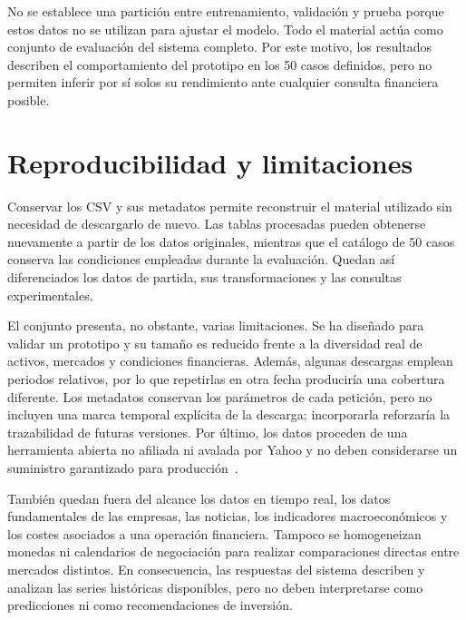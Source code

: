 No se establece una partición entre entrenamiento, validación y prueba porque estos datos no se utilizan para ajustar el modelo. Todo el material actúa como conjunto de evaluación del sistema completo. Por este motivo, los resultados describen el comportamiento del prototipo en los 50 casos definidos, pero no permiten inferir por sí solos su rendimiento ante cualquier consulta financiera posible.

\section{Reproducibilidad y limitaciones}

Conservar los CSV y sus metadatos permite reconstruir el material utilizado sin necesidad de descargarlo de nuevo. Las tablas procesadas pueden obtenerse nuevamente a partir de los datos originales, mientras que el catálogo de 50 casos conserva las condiciones empleadas durante la evaluación. Quedan así diferenciados los datos de partida, sus transformaciones y las consultas experimentales.

El conjunto presenta, no obstante, varias limitaciones. Se ha diseñado para validar un prototipo y su tamaño es reducido frente a la diversidad real de activos, mercados y condiciones financieras. Además, algunas descargas emplean periodos relativos, por lo que repetirlas en otra fecha produciría una cobertura diferente. Los metadatos conservan los parámetros de cada petición, pero no incluyen una marca temporal explícita de la descarga; incorporarla reforzaría la trazabilidad de futuras versiones. Por último, los datos proceden de una herramienta abierta no afiliada ni avalada por Yahoo y no deben considerarse un suministro garantizado para producción~\cite{yfinance}.

También quedan fuera del alcance los datos en tiempo real, los datos fundamentales de las empresas, las noticias, los indicadores macroeconómicos y los costes asociados a una operación financiera. Tampoco se homogeneizan monedas ni calendarios de negociación para realizar comparaciones directas entre mercados distintos. En consecuencia, las respuestas del sistema describen y analizan las series históricas disponibles, pero no deben interpretarse como predicciones ni como recomendaciones de inversión.
